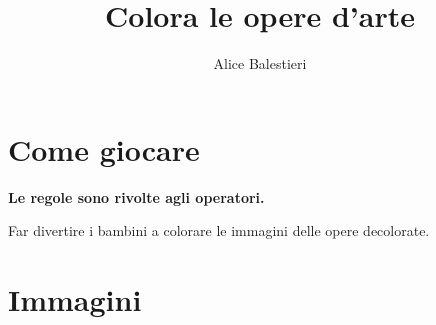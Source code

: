 \documentclass[hidelinks,12pt,a4paper]{article}
\begin{document}
	
	\title{\textbf{\\Colora le opere d'arte}}
	\author{Alice Balestieri}
	\date{}
	
	\maketitle
	\newpage
	
	\tableofcontents
	\newpage
	
	\section{Come giocare}
	\begin{center}
		\textbf{Le regole sono rivolte agli operatori.}
	\end{center}
	
	Far divertire i bambini a colorare le immagini delle opere decolorate.
	
	\section{Immagini}
	\newpage
	
\end{document}
